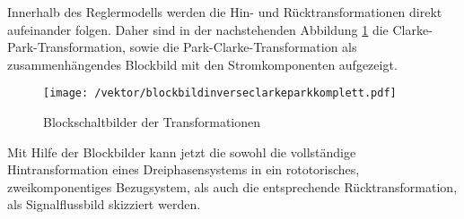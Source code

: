 Innerhalb des Reglermodells werden die Hin- und Rücktransformationen direkt aufeinander folgen. Daher sind in der nachstehenden Abbildung \ref{fig:blockbildinverseclarkeparkkomplett} die Clarke-Park-Transformation, sowie die Park-Clarke-Transformation als zusammenhängendes Blockbild mit den Stromkomponenten aufgezeigt.
\newpage

\begin{figure}[h]
	\centering
	\texttt{[image: /vektor/blockbildinverseclarkeparkkomplett.pdf]}
	\label{fig:blockbildinverseclarkeparkkomplett}
	\caption{Blockschaltbilder der Transformationen}
\end{figure}

Mit Hilfe der Blockbilder kann jetzt die sowohl die vollständige Hintransformation eines Dreiphasensystems in ein rototorisches, zweikomponentiges Bezugsystem, als auch die entsprechende Rücktransformation, als Signalflussbild skizziert werden.





 
